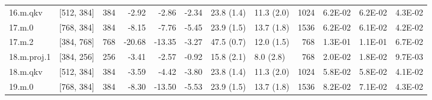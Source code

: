\begin{table}
\begin{tabular}{llrrrrllrrrr}
16.m.qkv & [512, 384] & 384 & {\cellcolor[HTML]{F2FAAE}} \color[HTML]{000000} -2.92 & {\cellcolor[HTML]{F1F9AC}} \color[HTML]{000000} -2.86 & {\cellcolor[HTML]{EFF8AA}} \color[HTML]{000000} -2.34 & 23.8 (1.4) & 11.3 (2.0) & 1024 & {\cellcolor[HTML]{FFF8B4}} \color[HTML]{000000} 6.2E-02 & {\cellcolor[HTML]{FFF8B4}} \color[HTML]{000000} 6.2E-02 & {\cellcolor[HTML]{EEF8A8}} \color[HTML]{000000} 4.3E-02 \\
17.m.0 & [768, 384] & 384 & {\cellcolor[HTML]{FFFEBE}} \color[HTML]{000000} -8.15 & {\cellcolor[HTML]{FFFEBE}} \color[HTML]{000000} -7.76 & {\cellcolor[HTML]{F8FCB6}} \color[HTML]{000000} -5.45 & 23.9 (1.5) & 13.7 (1.8) & 1536 & {\cellcolor[HTML]{FFF8B4}} \color[HTML]{000000} 6.2E-02 & {\cellcolor[HTML]{FFFAB6}} \color[HTML]{000000} 6.1E-02 & {\cellcolor[HTML]{EEF8A8}} \color[HTML]{000000} 4.2E-02 \\
17.m.2 & [384, 768] & 768 & {\cellcolor[HTML]{FEE18D}} \color[HTML]{000000} -20.68 & {\cellcolor[HTML]{FFF2AA}} \color[HTML]{000000} -13.35 & {\cellcolor[HTML]{F2FAAE}} \color[HTML]{000000} -3.27 & 47.5 (0.7) & 12.0 (1.5) & 768 & {\cellcolor[HTML]{F88C51}} \color[HTML]{F1F1F1} 1.3E-01 & {\cellcolor[HTML]{FDAF62}} \color[HTML]{000000} 1.1E-01 & {\cellcolor[HTML]{FFF2AA}} \color[HTML]{000000} 6.7E-02 \\
18.m.proj.1 & [384, 256] & 256 & {\cellcolor[HTML]{F2FAAE}} \color[HTML]{000000} -3.41 & {\cellcolor[HTML]{F1F9AC}} \color[HTML]{000000} -2.57 & {\cellcolor[HTML]{ECF7A6}} \color[HTML]{000000} -0.92 & 15.8 (2.1) & 8.0 (2.8) & 768 & {\cellcolor[HTML]{CDEA83}} \color[HTML]{000000} 2.0E-02 & {\cellcolor[HTML]{C9E881}} \color[HTML]{000000} 1.8E-02 & {\cellcolor[HTML]{BBE278}} \color[HTML]{000000} 9.7E-03 \\
18.m.qkv & [512, 384] & 384 & {\cellcolor[HTML]{F4FAB0}} \color[HTML]{000000} -3.59 & {\cellcolor[HTML]{F5FBB2}} \color[HTML]{000000} -4.42 & {\cellcolor[HTML]{F4FAB0}} \color[HTML]{000000} -3.80 & 23.8 (1.4) & 11.3 (2.0) & 1024 & {\cellcolor[HTML]{FFFCBA}} \color[HTML]{000000} 5.8E-02 & {\cellcolor[HTML]{FFFCBA}} \color[HTML]{000000} 5.8E-02 & {\cellcolor[HTML]{ECF7A6}} \color[HTML]{000000} 4.1E-02 \\
19.m.0 & [768, 384] & 384 & {\cellcolor[HTML]{FFFDBC}} \color[HTML]{000000} -8.30 & {\cellcolor[HTML]{FFF2AA}} \color[HTML]{000000} -13.50 & {\cellcolor[HTML]{F8FCB6}} \color[HTML]{000000} -5.53 & 23.9 (1.5) & 13.7 (1.8) & 1536 & {\cellcolor[HTML]{FEE491}} \color[HTML]{000000} 8.2E-02 & {\cellcolor[HTML]{FEEFA3}} \color[HTML]{000000} 7.1E-02 & {\cellcolor[HTML]{EEF8A8}} \color[HTML]{000000} 4.3E-02 \\

\end{tabular}
\end{table}
